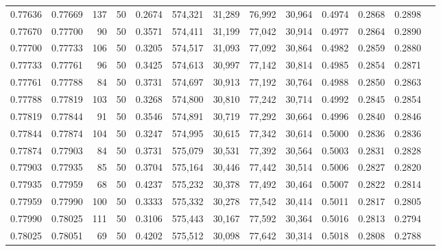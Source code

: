 \begin{tabular}{rrrrrrrrrrrrr}
0.77636 & 0.77669 &   137 &  50 &                                     0.2674 & 574,321 &  31,289 &  76,992 &  30,964 & 0.4974 & 0.2868 & 0.2898 \\
0.77670 & 0.77700 &    90 &  50 &                                     0.3571 & 574,411 &  31,199 &  77,042 &  30,914 & 0.4977 & 0.2864 & 0.2890 \\
0.77700 & 0.77733 &   106 &  50 &                                     0.3205 & 574,517 &  31,093 &  77,092 &  30,864 & 0.4982 & 0.2859 & 0.2880 \\
0.77733 & 0.77761 &    96 &  50 &                                     0.3425 & 574,613 &  30,997 &  77,142 &  30,814 & 0.4985 & 0.2854 & 0.2871 \\
0.77761 & 0.77788 &    84 &  50 &                                     0.3731 & 574,697 &  30,913 &  77,192 &  30,764 & 0.4988 & 0.2850 & 0.2863 \\
0.77788 & 0.77819 &   103 &  50 &                                     0.3268 & 574,800 &  30,810 &  77,242 &  30,714 & 0.4992 & 0.2845 & 0.2854 \\
0.77819 & 0.77844 &    91 &  50 &                                     0.3546 & 574,891 &  30,719 &  77,292 &  30,664 & 0.4996 & 0.2840 & 0.2846 \\
0.77844 & 0.77874 &   104 &  50 &                                     0.3247 & 574,995 &  30,615 &  77,342 &  30,614 & 0.5000 & 0.2836 & 0.2836 \\
0.77874 & 0.77903 &    84 &  50 &                                     0.3731 & 575,079 &  30,531 &  77,392 &  30,564 & 0.5003 & 0.2831 & 0.2828 \\
0.77903 & 0.77935 &    85 &  50 &                                     0.3704 & 575,164 &  30,446 &  77,442 &  30,514 & 0.5006 & 0.2827 & 0.2820 \\
0.77935 & 0.77959 &    68 &  50 &                                     0.4237 & 575,232 &  30,378 &  77,492 &  30,464 & 0.5007 & 0.2822 & 0.2814 \\
0.77959 & 0.77990 &   100 &  50 &                                     0.3333 & 575,332 &  30,278 &  77,542 &  30,414 & 0.5011 & 0.2817 & 0.2805 \\
0.77990 & 0.78025 &   111 &  50 &                                     0.3106 & 575,443 &  30,167 &  77,592 &  30,364 & 0.5016 & 0.2813 & 0.2794 \\
0.78025 & 0.78051 &    69 &  50 &                                     0.4202 & 575,512 &  30,098 &  77,642 &  30,314 & 0.5018 & 0.2808 & 0.2788 \\

\end{tabular}
